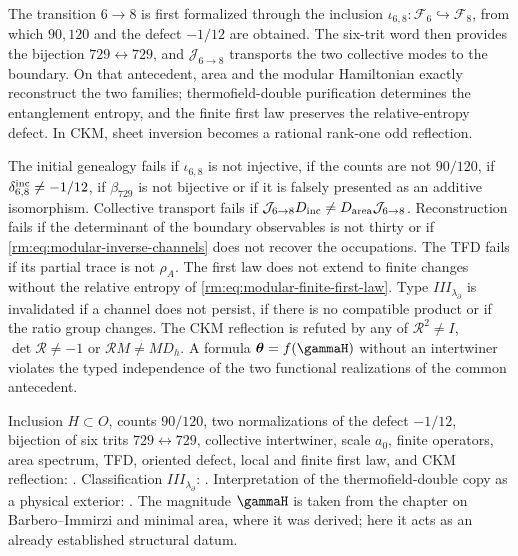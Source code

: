 \begin{keyresult}
The transition \(6\to8\) is first formalized through the inclusion
\(\iota_{6,8}:\mathcal F_6\hookrightarrow\mathcal F_8\), from which
\(90,120\) and the defect \(-1/12\) are
obtained. The six-trit word then provides the bijection \(729\leftrightarrow729\), and
\(\mathcal J_{6\to8}\) transports the two collective modes to the boundary. On
that antecedent, area and the modular Hamiltonian exactly reconstruct
the two families; thermofield-double purification determines the entanglement entropy,
and the finite first law
preserves the relative-entropy defect. In CKM, sheet inversion
becomes a rational rank-one odd reflection.
\end{keyresult}

\begin{falsifier}
The initial genealogy fails if \(\iota_{6,8}\) is not injective, if the
counts are not \(90/120\), if \(\delta_{6,8}^{\rm inc}\neq-1/12\), if
\(\beta_{729}\) is not bijective or if it is falsely presented as an
additive isomorphism. Collective transport fails if
\(\mathcal J_{6\to8}D_{\rm inc}\neq
D_{\rm area}\mathcal J_{6\to8}\). Reconstruction fails if the
determinant of the boundary observables is not thirty or if
\cref{rm:eq:modular-inverse-channels} does not recover the occupations.
The TFD fails if its partial trace is not \(\rho_A\). The first law does not
extend to finite changes without the relative entropy of
\cref{rm:eq:modular-finite-first-law}. Type
\(III_{\lambda_\partial}\) is invalidated if a channel does not persist, if there is no
compatible product or if the ratio group changes. The CKM reflection
is refuted by any of
\(\mathcal R^2\neq I\), \(\det\mathcal R\neq-1\) or
\(\mathcal RM\neq MD_h\). A formula
\(\boldsymbol\theta=f(\gammaH)\) without an intertwiner violates the typed
independence of the two functional realizations of the common antecedent.
\end{falsifier}

\begin{statusbox}
Inclusion \(H\subset O\), counts \(90/120\), two normalizations of the
defect \(-1/12\), bijection of six trits \(729\leftrightarrow729\),
collective intertwiner, scale \(a_0\), finite operators, area spectrum,
TFD, oriented defect, local and finite first law, and CKM reflection:
.
Classification
\(III_{\lambda_\partial}\): . Interpretation of the thermofield-double copy as a physical exterior:
. The magnitude \(\gammaH\) is taken
from the chapter on Barbero--Immirzi and minimal area, where it was derived; here it acts
as an already established structural datum.
\end{statusbox}
